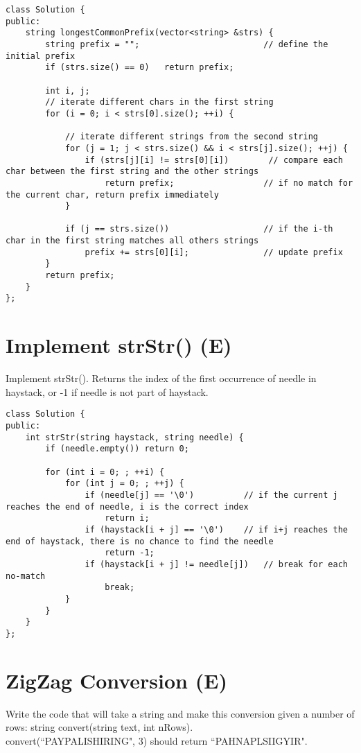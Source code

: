 \begin{lstlisting}
class Solution {
public:
    string longestCommonPrefix(vector<string> &strs) {
        string prefix = "";                         // define the initial prefix
        if (strs.size() == 0)   return prefix;
        
        int i, j;
        // iterate different chars in the first string
        for (i = 0; i < strs[0].size(); ++i) { 
            
            // iterate different strings from the second string
            for (j = 1; j < strs.size() && i < strs[j].size(); ++j) {     
                if (strs[j][i] != strs[0][i])        // compare each char between the first string and the other strings
                    return prefix;                  // if no match for the current char, return prefix immediately
            }
            
            if (j == strs.size())                   // if the i-th char in the first string matches all others strings
                prefix += strs[0][i];               // update prefix
        }
        return prefix;
    }
};
\end{lstlisting}


\section{Implement strStr() (E)}
Implement strStr(). Returns the index of the first occurrence of needle in haystack, or -1 if needle is not part of haystack. \\

\begin{lstlisting}
class Solution {
public:
    int strStr(string haystack, string needle) {
        if (needle.empty()) return 0;

        for (int i = 0; ; ++i) {
            for (int j = 0; ; ++j) {
                if (needle[j] == '\0')          // if the current j reaches the end of needle, i is the correct index
                    return i;
                if (haystack[i + j] == '\0')    // if i+j reaches the end of haystack, there is no chance to find the needle
                    return -1;
                if (haystack[i + j] != needle[j])   // break for each no-match
                    break;
            }
        }
    }
};
\end{lstlisting}


\section{ZigZag Conversion (E)}
Write the code that will take a string and make this conversion given a number of rows: string convert(string text, int nRows). \\
convert(``PAYPALISHIRING", 3) should return ``PAHNAPLSIIGYIR". \\

